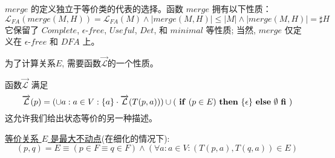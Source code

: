 

$merge$ 的定义独立于等价类的代表的选择。函数 $merge$ 拥有以下性质：
\begin{equation*}
    \mathcal{L}_{FA}(merge(M,H)) = \mathcal{L}_{FA}(M) \land | merge(M,H) | \leq |M| \land | merge(M,H)| = \sharp H
\end{equation*}
它保留了 $Complete$, $\epsilon$-$free$, $Useful$, $Det$, 和 $minimal$ 等性质; 当然, $merge$ 仅定义在 $\epsilon$-$free$ 和 $DFA$ 上。

为了计算关系$E$, 需要函数$\overrightarrow{\mathcal{L}}$的一个性质。

\begin{property}
    函数$\overrightarrow{\mathcal{L}}$ 满足
    \[ \overrightarrow{\mathcal{L}}(p) = (\cup a:a \in V : \{a\} \cdot \overrightarrow{\mathcal{L}}(T(p,a))) \cup ( \mbox{ \textbf{if} }   (p \in E) \mbox{ \textbf{then} }   \{\epsilon\} \mbox{ \textbf{else} }   {\emptyset  \mbox{ \textbf{fi} }}) \]
    这允许我们给出状态等价的另一种描述。
\end{property}


\begin{definition}[状态的等价]\label{def:eqstate}
    \uline{等价关系 $E$ 是最大不动点}(在细化的情况下):
    \[ (p,q) = E \equiv ( p \in F \equiv q \in F ) \land ( \forall a:a \in V : (T(p,a),T(q,a)) \in E ) \]
    
\end{definition}

